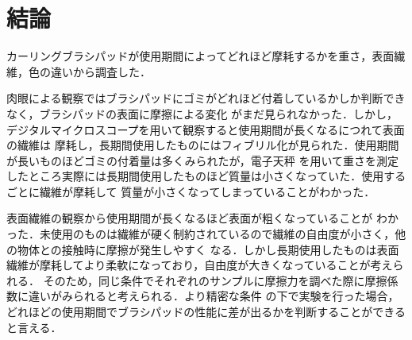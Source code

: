 \documentclass[main]{subfiles}
\begin{document}
\chapter{結論}
カーリングブラシパッドが使用期間によってどれほど摩耗するかを重さ，表面繊維，色の違いから調査した．

肉眼による観察ではブラシパッドにゴミがどれほど付着しているかしか判断できなく，ブラシパッドの表面に摩擦による変化
がまだ見られなかった．しかし，デジタルマイクロスコープを用いて観察すると使用期間が長くなるにつれて表面の繊維は
摩耗し，長期間使用したものにはフィブリル化が見られた．使用期間が長いものほどゴミの付着量は多くみられたが，電子天秤
を用いて重さを測定したところ実際には長期間使用したものほど質量は小さくなっていた．使用するごとに繊維が摩耗して
質量が小さくなってしまっていることがわかった．

表面繊維の観察から使用期間が長くなるほど表面が粗くなっていることが
わかった．未使用のものは繊維が硬く制約されているので繊維の自由度が小さく，他の物体との接触時に摩擦が発生しやすく
なる．しかし長期使用したものは表面繊維が摩耗してより柔軟になっており，自由度が大きくなっていることが考えられる．
そのため，同じ条件でそれぞれのサンプルに摩擦力を調べた際に摩擦係数に違いがみられると考えられる．より精密な条件
の下で実験を行った場合，どれほどの使用期間でブラシパッドの性能に差が出るかを判断することができると言える．
\end{document}
